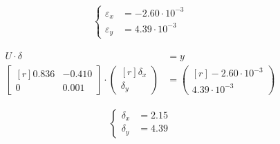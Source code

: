 \documentclass[../main.tex]{subfiles}
\begin{document}
\begin{example}
\begin{enumerate}
                    \begin{equation}
                        \begin{split}
                            \left\lbrace
                            \begin{array}{ll}
                                \varepsilon_x &= -2.60 \cdot 10^{-3}\\
                                \varepsilon_y &= 4.39 \cdot 10^{-3}
                            \end{array}
                            \right.
                        \end{split}
                    \end{equation}
                    
                    \begin{equation}
                        \begin{split}
                            U \cdot \delta &= y \\
                            \begin{bmatrix*}[r]
                                0.836 & -0.410\\
                                0 & 0.001
                            \end{bmatrix*} \cdot
                            \begin{pmatrix*}[r]
                                \delta_x\\
                                \delta_y
                            \end{pmatrix*} &=
                            \begin{pmatrix*}[r]
                                -2.60 \cdot 10^{-3} \\
                                4.39 \cdot 10^{-3}
                            \end{pmatrix*}
                        \end{split}
                    \end{equation}

                    \begin{equation}
                        \begin{split}
                            \left\lbrace
                            \begin{array}{ll}
                                \delta_x &= 2.15\\
                                \delta_y &= 4.39
                            \end{array}
                            \right.
                        \end{split}
                    \end{equation}


\end{enumerate}
\end{example}
\end{document}
